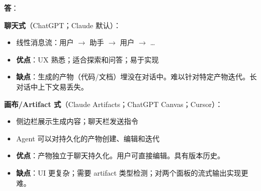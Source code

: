 \begin{questionbox}
\textbf{答}：

\textbf{聊天式}（ChatGPT；Claude 默认）：

\begin{itemize}
  \item 线性消息流：用户 $\to$ 助手 $\to$ 用户 $\to$ \ldots{}
  \item \textbf{优点}：UX 熟悉；适合探索和问答；易于实现
  \item \textbf{缺点}：生成的产物（代码/文档）埋没在对话中。难以针对特定产物迭代。长对话中上下文易丢失。
\end{itemize}

\textbf{画布/Artifact 式}（Claude Artifacts；ChatGPT Canvas；Cursor）：

\begin{itemize}
  \item 侧边栏展示生成内容；聊天栏发送指令
  \item Agent 可以对持久化的产物创建、编辑和迭代
  \item \textbf{优点}：产物独立于聊天持久化。用户可直接编辑。具有版本历史。
  \item \textbf{缺点}：UI 更复杂；需要 artifact 类型检测；对两个面板的流式输出实现更难。
\end{itemize}


\end{questionbox}
